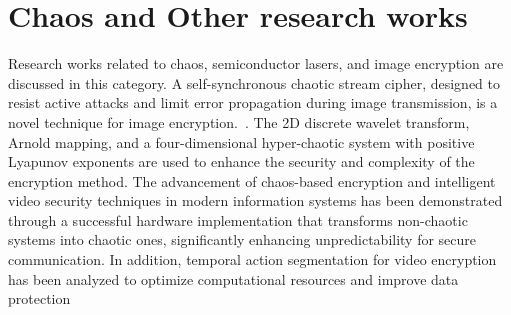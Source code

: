 \section{Chaos and Other research works}\label{Sec:ReviewTopicOthers}
Research works related to chaos, semiconductor lasers, and image encryption are discussed in this category. 
A self-synchronous chaotic stream cipher, designed to resist active attacks and limit error propagation during image transmission, is a novel technique for image encryption.~\cite{Fan2018}. The 2D discrete wavelet transform, Arnold mapping, and a four-dimensional hyper-chaotic system with positive Lyapunov exponents are used to enhance the security and complexity of the encryption method. The advancement of chaos-based encryption and intelligent video security techniques in modern information systems has been demonstrated through a successful hardware implementation that transforms non-chaotic systems into chaotic ones, significantly enhancing unpredictability for secure communication. In addition, temporal action segmentation for video encryption has been analyzed to optimize computational resources and improve data protection~\cite{Gao2024,Liu2024k}
